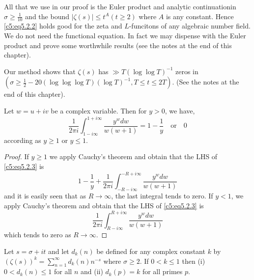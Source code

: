 \begin{remark}\label{c5:rem2}
All that we use in our proof is the Euler product and analytic 
continuation\pageoriginale in $\sigma\geq \frac{1}{10}$ and the bound
$|\zeta(s)|\leq t^{A}(t\geq 2)$ where $A$ is any constant. Hence
\eqref{c5:eq5.2.2} holds good for the zeta and $L$-funcitons of any
algebraic number field. We do not need the functional equation. In
fact we may dispense with the Euler product and prove some worthwhile
results (see the notes at the end of this chapter).
\end{remark}

\begin{remark}\label{c5:rem3}
Our method shows that $\zeta(s)$ has $\gg T(\log\log T)^{-1}$ zeros in
$(\sigma\geq \frac{1}{2}-20(\log\log\log T)(\log T)^{-1}, T\leq
t\leq 2T)$. (See the notes at the end of this chapter).
\end{remark}

\setcounter{lem}{0}
\begin{lem}\label{c5:lem1}
Let $w=u+iv$ be a complex variable. Then for $y>0$, we have,
\begin{equation*}
\frac{1}{2\pi
  i}\int^{1+i\infty}_{1-i\infty}\frac{y^{w}dw}{w(w+1)}=1-\frac{1}{y}\quad
\text{or}\quad 0\tag{5.2.3}\label{c5:eq5.2.3}
\end{equation*}
according as $y\geq 1$ or $y\leq 1$.
\end{lem}

\begin{proof}
If $y\geq 1$ we apply Cauchy's theorem and obtain that the LHS of
\eqref{c5:eq5.2.3} is 
\begin{equation*}
1-\frac{1}{y}+\frac{1}{2\pi
  i}\int^{-R+i\infty}_{-R-i\infty}\frac{y^{w}dw}{w(w+1)}\tag{5.2.4}\label{c5:eq5.2.4} 
\end{equation*}
and it is easily seen that as $R\to \infty$, the last integral tends
to zero. If $y<1$, we apply Cauchy's theorem and obtain that the LHS
of \eqref{c5:eq5.2.3} is
\begin{equation*}
\frac{1}{2\pi
  i}\int^{R+i\infty}_{R-i\infty}\frac{y^{w}dw}{w(w+1)}\tag{5.2.5}\label{c5:eq5.2.5} 
\end{equation*}
which tends to zero as $R\to \infty$.
\end{proof}

\begin{lem}\label{c5:lem2}
Let $s=\sigma+it$ and let $d_{k}(n)$ be defined for any complex
constant $k$ by
$(\zeta(s))^{k}=\sum\limits^{\infty}_{n=1}d_{k}(n)n^{-s}$ where
$\sigma\geq 2$. If $0<k\leq 1$ then {\rm(i)} $0<d_{k}(n)\leq 1$ for
all $n$ and {\rm(ii)} $d_{k}(p)=k$ for all primes $p$.
\end{lem}

